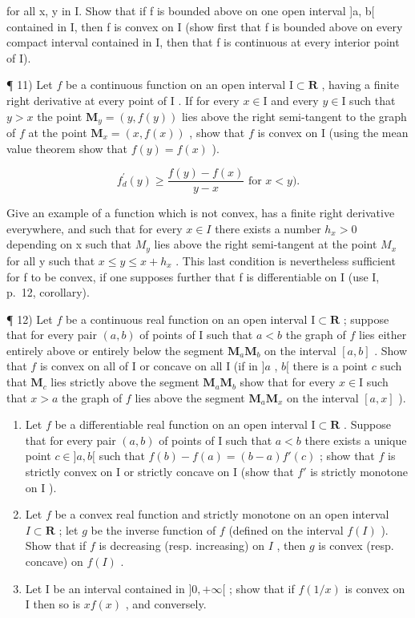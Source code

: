 for all x, y in I. Show that if f is bounded above on one open interval {]}a, b{[} contained in I, then f is convex on I (show first that f is bounded above on every compact interval contained in I, then that f is continuous at every interior point of I).

¶ 11) Let \(f\) be a continuous function on an open interval \(\mathrm{I} \subset \mathbf{R}\) , having a finite right derivative at every point of \(\mathrm{I}\) . If for every \(x \in \mathrm{I}\) and every \(y \in \mathrm{I}\) such that \(y > x\) the point \(\mathbf{M}_y = (y, f(y))\) lies above the right semi-tangent to the graph of \(f\) at the point \(\mathbf{M}_x = (x, f(x))\) , show that \(f\) is convex on \(\mathrm{I}\) (using the mean value theorem show that \(f(y) = f(x)\) ).

\[
f _ {d} ^ {\prime} (y) \geqslant \frac {f (y) - f (x)}{y - x} \text {   for   } x <   y).
\]

Give an example of a function which is not convex, has a finite right derivative everywhere, and such that for every \(x \in I\) there exists a number \(h_{x} > 0\) depending on x such that \(M_{y}\) lies above the right semi-tangent at the point \(M_{x}\) for all y such that \(x \leqslant y \leqslant x + h_{x}\) . This last condition is nevertheless sufficient for f to be convex, if one supposes further that f is differentiable on I (use I, p.~12, corollary).

¶ 12) Let \(f\) be a continuous real function on an open interval \(\mathrm{I}\subset \mathbf{R}\) ; suppose that for every pair \((a,b)\) of points of I such that \(a < b\) the graph of \(f\) lies either entirely above or entirely below the segment \(\mathbf{M}_a\mathbf{M}_b\) on the interval \([a,b]\) . Show that \(f\) is convex on all of I or concave on all I (if in \(]a\) , \(b[\) there is a point \(c\) such that \(\mathbf{M}_c\) lies strictly above the segment \(\mathbf{M}_a\mathbf{M}_b\) show that for every \(x\in \mathrm{I}\) such that \(x > a\) the graph of \(f\) lies above the segment \(\mathbf{M}_a\mathbf{M}_x\) on the interval \([a,x]\) ).

\begin{enumerate}
\def\labelenumi{\arabic{enumi})}
\setcounter{enumi}{12}
\item
  Let \(f\) be a differentiable real function on an open interval \(\mathrm{I} \subset \mathbf{R}\) . Suppose that for every pair \((a, b)\) of points of \(\mathrm{I}\) such that \(a < b\) there exists a unique point \(c \in ]a, b[\) such that \(f(b) - f(a) = (b - a)f'(c)\) ; show that \(f\) is strictly convex on \(\mathrm{I}\) or strictly concave on \(\mathrm{I}\) (show that \(f'\) is strictly monotone on \(\mathrm{I}\) ).
\item
  Let \(f\) be a convex real function and strictly monotone on an open interval \(I \subset \mathbf{R}\) ; let \(g\) be the inverse function of \(f\) (defined on the interval \(f(I)\) ). Show that if \(f\) is decreasing (resp. increasing) on \(I\) , then \(g\) is convex (resp. concave) on \(f(I)\) .
\item
  Let I be an interval contained in \(]0, +\infty[\) ; show that if \(f(1 / x)\) is convex on I then so is \(xf(x)\) , and conversely.
\end{enumerate}

